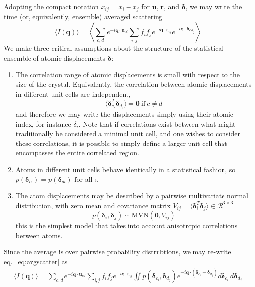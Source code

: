\documentclass{article}
\begin{document}
Adopting the compact notation $x_{ij} = x_i - x_j$ for $\mathbf{u}$, $\mathbf{r}$, and $\boldsymbol{\delta}$, we may write the time (or, equivalently, ensemble) averaged scattering
\begin{equation}
\langle I (\mathbf{q}) \rangle = \left\langle 
\sum\limits_{c,d} e^{-i \mathbf{q} \cdot \mathbf{u}_{c d}} 
\sum\limits_{i,j} f_i f_j e^{-i \mathbf{q} \cdot \mathbf{r}_{ij}} 
e^{-i \mathbf{q} \cdot \boldsymbol{\delta}_{c_i d_j}} 
\right \rangle
\label{eq:avgscatter}
\end{equation}
%
We make three critical assumptions about the structure of the statistical ensemble of atomic displacements $\boldsymbol{\delta}$:
%
%
\begin{enumerate}

\item The correlation range of atomic displacements is small with respect to the size of the crystal. Equivalently, the correlation between atomic displacements in different unit cells are independent,
\[
\langle \boldsymbol{\delta}_{c_i}^T \boldsymbol{\delta}_{d_j} \rangle = \mathbf{0} 
\ \mathrm{if} \ c \neq d
\]
and therefore we may write the displacements simply using their atomic index, for instance ${\delta}_{i}$. Note that if correlations exist between what might traditionally be considered a minimal unit cell, and one wishes to consider these correlations, it is possible to simply define a larger unit cell that encompasses the entire correlated region.

\item Atoms in different unit cells behave identically in a statistical fashion, so $p(\boldsymbol{\delta}_{c i}) = p(\boldsymbol{\delta}_{d i})$ for all $i$.

\item The atom displacements may be described by a pairwise multivariate normal distribution, with zero mean and covariance matrix $V_{ij} = \langle \boldsymbol{\delta}_{i}^T\boldsymbol{\delta}_{j} \rangle \in \mathcal{R}^{3 \times 3}$
\[
p( \boldsymbol{\delta}_{i}, \boldsymbol{\delta}_{j} ) \sim \mathrm{MVN}( \mathbf{0}, V_{ij})
\]
this is the simplest model that takes into account anisotropic correlations between atoms.

\end{enumerate}
%
%
Since the average is over pairwise probability distrubtions, we may re-write eq.~\ref{eq:avgscatter} as
\begin{align}
\langle I (\mathbf{q}) \rangle =
\sum\limits_{c,d} e^{-i \mathbf{q} \cdot \mathbf{u}_{c d}} 
\sum\limits_{i,j} f_i f_j e^{-i \mathbf{q} \cdot \mathbf{r}_{ij}} 
%
\iint p( \boldsymbol{\delta}_{c_i},  \boldsymbol{\delta}_{d_j} )
e^{-i \mathbf{q} \cdot ( \boldsymbol{\delta}_{c_i}  - \boldsymbol{\delta}_{d_j})} 
d \boldsymbol{\delta}_{c_i}  \, d \boldsymbol{\delta}_{d_j}
%
\end{align}
\end{document}
